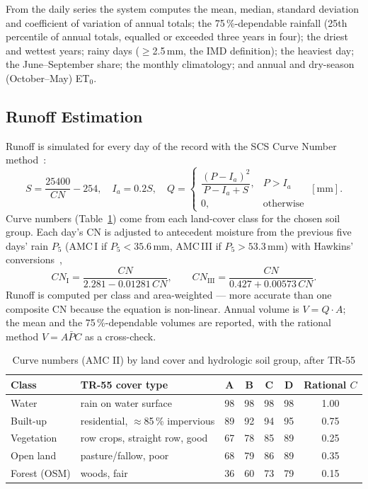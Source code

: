 \documentclass[manuscript,screen,review]{acmart}
\begin{document}
From the daily series the system computes the mean, median, standard deviation and
coefficient of variation of annual totals; the 75\,\%-dependable rainfall (25th percentile of
annual totals, equalled or exceeded three years in four); the driest and wettest years; rainy
days ($\geq$2.5\,mm, the IMD definition); the heaviest day; the June--September share; the
monthly climatology; and annual and dry-season (October--May) ET$_0$.

\subsection{Runoff Estimation}
Runoff is simulated for every day of the record with the SCS Curve Number method~\cite{tr55}:
\begin{equation}
S=\frac{25400}{CN}-254,\quad I_a=0.2S,\quad
Q=\begin{cases}\dfrac{(P-I_a)^2}{P-I_a+S}, & P>I_a\\[3pt] 0, & \text{otherwise}\end{cases}\ [\text{mm}].
\end{equation}
Curve numbers (Table~\ref{tab:cn}) come from each land-cover class for the chosen soil group.
Each day's CN is adjusted to antecedent moisture from the previous five days' rain $P_5$
(AMC\,I if $P_5<35.6$\,mm, AMC\,III if $P_5>53.3$\,mm) with Hawkins'
conversions~\cite{hawkins1985},
\begin{equation}
CN_{\mathrm{I}}=\frac{CN}{2.281-0.01281\,CN},\qquad CN_{\mathrm{III}}=\frac{CN}{0.427+0.00573\,CN}.
\end{equation}
Runoff is computed per class and area-weighted --- more accurate than one composite CN because
the equation is non-linear. Annual volume is $V=Q\cdot A$; the mean and the 75\,\%-dependable
volumes are reported, with the rational method $V=A\bar PC$ as a cross-check.

\begin{table}[h]
  \caption{Curve numbers (AMC II) by land cover and hydrologic soil group, after TR-55}
  \label{tab:cn}
  \small
  \begin{tabular}{@{}llccccc@{}}
    \toprule
    Class & TR-55 cover type & A & B & C & D & Rational $C$ \\
    \midrule
    Water & rain on water surface & 98 & 98 & 98 & 98 & 1.00 \\
    Built-up & residential, $\approx$85\,\% impervious & 89 & 92 & 94 & 95 & 0.75 \\
    Vegetation & row crops, straight row, good & 67 & 78 & 85 & 89 & 0.25 \\
    Open land & pasture/fallow, poor & 68 & 79 & 86 & 89 & 0.35 \\
    Forest (OSM) & woods, fair & 36 & 60 & 73 & 79 & 0.15 \\
    \bottomrule
  \end{tabular}
\end{table}
\end{document}
